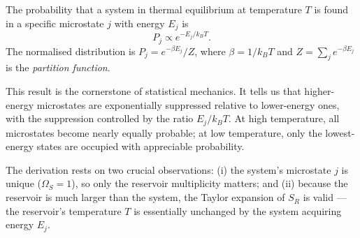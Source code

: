 \begin{theorem}
\label{thm:boltzmann}
The probability that a system in thermal equilibrium at temperature $T$ is found in a specific microstate $j$ with energy $E_j$ is
\begin{equation}
    \boxed{P_j \propto e^{-E_j/k_BT}}.
\end{equation}
The normalised distribution is $P_j = e^{-\beta E_j}/Z$, where $\beta = 1/k_BT$ and $Z = \sum_j e^{-\beta E_j}$ is the \emph{partition function}.
\end{theorem}

This result is the cornerstone of statistical mechanics. It tells us that higher-energy microstates are exponentially suppressed relative to lower-energy ones, with the suppression controlled by the ratio $E_j/k_BT$. At high temperature, all microstates become nearly equally probable; at low temperature, only the lowest-energy states are occupied with appreciable probability.

The derivation rests on two crucial observations: (i) the system's microstate $j$ is unique ($\Omega_S = 1$), so only the reservoir multiplicity matters; and (ii) because the reservoir is much larger than the system, the Taylor expansion of $S_R$ is valid — the reservoir's temperature $T$ is essentially unchanged by the system acquiring energy $E_j$.
